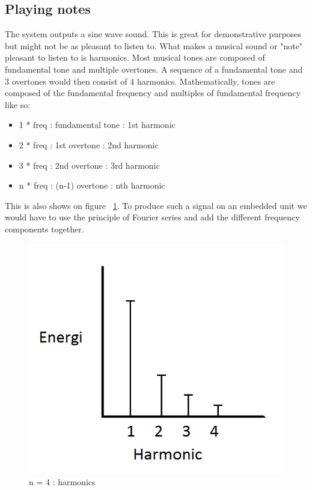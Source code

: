 \subsection{Playing notes}
The system outputs a sine wave sound. This is great for demonstrative purposes but might not be as pleasant to listen to. What makes a musical sound or "note" pleasant to listen to is harmonics. Most musical tones are composed of fundamental tone and multiple overtones. A sequence of a fundamental tone and 3 overtones would then consist of 4 harmonics. Mathematically, tones are composed of the fundamental frequency and multiples of fundamental frequency like so:\\
\begin{itemize}
\item 1 * freq : fundamental tone : 1st harmonic
\item 2 * freq : 1st overtone     : 2nd harmonic
\item 3 * freq : 2nd overtone     : 3rd harmonic
\item n * freq : (n-1) overtone   : nth harmonic
\end{itemize}
This is also shows on figure ~\ref{fig:harmonics}. To produce such a signal on an embedded unit we would have to use the principle of Fourier series and add the different frequency components together. 
\begin{figure}[hbpt]
\centering
\includegraphics[scale=0.5]{billeder/harmonics}
\caption{n = 4 : harmonics}
\label{fig:harmonics}
\end{figure}
